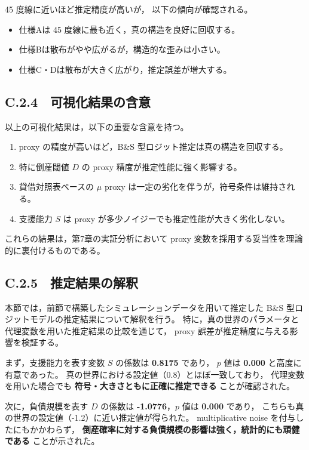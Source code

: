 45 度線に近いほど推定精度が高いが，
以下の傾向が確認される。

\begin{itemize}
    \item 仕様Aは 45 度線に最も近く，真の構造を良好に回収する。
    \item 仕様Bは散布がやや広がるが，構造的な歪みは小さい。
    \item 仕様C・Dは散布が大きく広がり，推定誤差が増大する。
\end{itemize}

\subsection*{C.2.4　可視化結果の含意}

以上の可視化結果は，以下の重要な含意を持つ。

\begin{enumerate}
    \item proxy の精度が高いほど，B\&S 型ロジット推定は真の構造を回収する。
    \item 特に倒産閾値 $D$ の proxy 精度が推定性能に強く影響する。
    \item 貸借対照表ベースの $\mu$ proxy は一定の劣化を伴うが，符号条件は維持される。
    \item 支援能力 $S$ は proxy が多少ノイジーでも推定性能が大きく劣化しない。
\end{enumerate}

これらの結果は，第7章の実証分析において
proxy 変数を採用する妥当性を理論的に裏付けるものである。

\subsection*{C.2.5　推定結果の解釈}

本節では，前節で構築したシミュレーションデータを用いて推定した
B\&S 型ロジットモデルの推定結果について解釈を行う。
特に，真の世界のパラメータと代理変数を用いた推定結果の比較を通じて，
proxy 誤差が推定精度に与える影響を検証する。

まず，支援能力を表す変数 $S$ の係数は \textbf{0.8175} であり，
$p$ 値は \textbf{0.000} と高度に有意であった。
真の世界における設定値（0.8）とほぼ一致しており，
代理変数を用いた場合でも \textbf{符号・大きさともに正確に推定できる} ことが確認された。

次に，負債規模を表す $D$ の係数は \textbf{-1.0776}，$p$ 値は \textbf{0.000} であり，
こちらも真の世界の設定値（-1.2）に近い推定値が得られた。
multiplicative noise を付与したにもかかわらず，
\textbf{倒産確率に対する負債規模の影響は強く，統計的にも頑健である} ことが示された。

